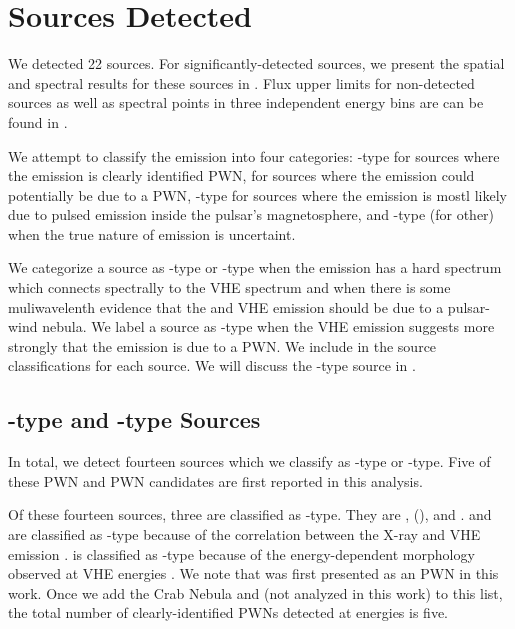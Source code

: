 \section{Sources Detected}



We detected 22 sources.  For significantly-detected
sources, we present
the spatial and spectral results for these sources in
.
Flux upper limits for non-detected sources
as well as spectral points in three independent energy
bins are can be found in
\cite{acero_2013a_constraints-galactic}.


We attempt to classify the \gev emission into four categories: \PWNClass-type
for sources where the \gev emission is clearly identified \ac{PWN},
\PWNcClass for sources where the \gev emission could potentially be due
to a \ac{PWN}, \PSRClass-type for sources where the emission is mostl likely
due to pulsed emission inside the pulsar's magnetosphere, and \OtherClass-type
(for other) when the true nature of emission is uncertaint.

We categorize a source as \PWNClass-type or \PWNcClass-type when
the emission has a hard spectrum which connects spectrally to the
\ac{VHE} spectrum and when there is some muliwavelenth evidence that
the \gev and \ac{VHE} emission should be due to a pulsar-wind nebula.
We label a source as \PWNClass-type when the \ac{VHE} emission suggests
more strongly that the emission is due to a \ac{PWN}.  We include
in  the source classifications
for each source.  We will discuss the \PWNClass-type source in
.


\subsection{\PWNClass-type and \PWNcClass-type Sources}

In total, we detect fourteen sources which we classify as \PWNClass-type
or \PWNcClass-type. Five of these \ac{PWN} and \ac{PWN} candidates are
first reported in this analysis.

Of these fourteen sources, three are classified as \PWNClass-type.  They
are , \mshfifteenfiftytwo (), and .
 and \mshfifteenfiftytwo are classified as \PWNClass-type
because of the correlation between the X-ray and \ac{VHE} emission
\citep{h.e.s.s.collaboration_2011a_discovery-source,aharonian_2005a_discovery-extended}.
 is classified as \PWNClass-type because of
the energy-dependent morphology observed at \ac{VHE} energies
\citep{aharonian_2006a_energy-dependent}.  We note that 
was first presented as an \ac{PWN} in this work.  Once we add the Crab
Nebula and \velax (not analyzed in this work) to this list, the total
number of clearly-identified \acp{PWN} detected at \gev energies is five.


